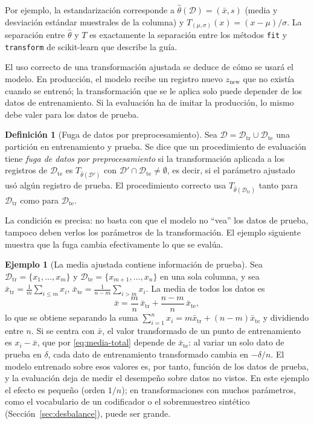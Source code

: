 \documentclass[11pt]{article}
\theoremstyle{definition}
\newtheorem{definicion}[teorema]{Definición}
\newtheorem{ejemplo}[teorema]{Ejemplo}
\theoremstyle{remark}
\newcommand{\Dtr}{\mathcal{D}_{\mathrm{tr}}}
\newcommand{\Dte}{\mathcal{D}_{\mathrm{te}}}
\begin{document}
\noindent Por ejemplo, la estandarización corresponde a $\hat\theta(\mathcal{D})=(\bar x,s)$ (media y desviación estándar muestrales de la columna) y $T_{(\mu,\sigma)}(x)=(x-\mu)/\sigma$. La separación entre $\hat\theta$ y $T$ es exactamente la separación entre los métodos \texttt{fit} y \texttt{transform} de scikit-learn que describe la guía.

\medskip

\noindent El uso correcto de una transformación ajustada se deduce de cómo se usará el modelo. En producción, el modelo recibe un registro nuevo $z_{\mathrm{new}}$ que no existía cuando se entrenó; la transformación que se le aplica solo puede depender de los datos de entrenamiento. Si la evaluación ha de imitar la producción, lo mismo debe valer para los datos de prueba.

\begin{definicion}[Fuga de datos por preprocesamiento]\label{def:fuga}
\noindent Sea $\mathcal{D}=\Dtr\cup\Dte$ una partición en entrenamiento y prueba. Se dice que un procedimiento de evaluación tiene \emph{fuga de datos por preprocesamiento} si la transformación aplicada a los registros de $\Dte$ es $T_{\hat\theta(\mathcal{D}')}$ con $\mathcal{D}'\cap\Dte\neq\emptyset$, es decir, si el parámetro ajustado usó algún registro de prueba. El procedimiento correcto usa $T_{\hat\theta(\Dtr)}$ tanto para $\Dtr$ como para $\Dte$.
\end{definicion}

\noindent La condición es precisa: no basta con que el modelo no ``vea'' los datos de prueba, tampoco deben verlos los parámetros de la transformación. El ejemplo siguiente muestra que la fuga cambia efectivamente lo que se evalúa.

\begin{ejemplo}[La media ajustada contiene información de prueba]\label{ej:fuga-media}
\noindent Sea $\Dtr=\{x_1,\dots,x_m\}$ y $\Dte=\{x_{m+1},\dots,x_n\}$ en una sola columna, y sea $\bar x_{\mathrm{tr}}=\frac1m\sum_{i\le m}x_i$, $\bar x_{\mathrm{te}}=\frac1{n-m}\sum_{i>m}x_i$. La media de todos los datos es
\begin{equation}\label{eq:media-total}
\bar x=\frac{m}{n}\,\bar x_{\mathrm{tr}}+\frac{n-m}{n}\,\bar x_{\mathrm{te}},
\end{equation}
lo que se obtiene separando la suma $\sum_{i=1}^n x_i=m\bar x_{\mathrm{tr}}+(n-m)\bar x_{\mathrm{te}}$ y dividiendo entre $n$. Si se centra con $\bar x$, el valor transformado de un punto de entrenamiento es $x_i-\bar x$, que por \eqref{eq:media-total} depende de $\bar x_{\mathrm{te}}$: al variar un solo dato de prueba en $\delta$, cada dato de entrenamiento transformado cambia en $-\delta/n$. El modelo entrenado sobre esos valores es, por tanto, función de los datos de prueba, y la evaluación deja de medir el desempeño sobre datos no vistos. En este ejemplo el efecto es pequeño (orden $1/n$); en transformaciones con muchos parámetros, como el vocabulario de un codificador o el sobremuestreo sintético (Sección~\ref{sec:desbalance}), puede ser grande.
\end{ejemplo}
\end{document}
